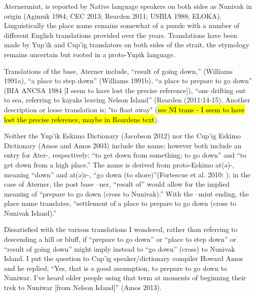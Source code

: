 Aternermiut, is reported by Native language speakers on both sides as Nunivak in origin (Agimuk 1984; CEC 2013; Rearden 2011; USBIA 1988; ELOKA). Linguistically the place name remains somewhat of a puzzle with a number of different English translations provided over the years. Translations have been made by Yup’ik and Cup’ig translators on both sides of the strait, the etymology remains uncertain but rooted in a proto-Yupik language.

Translations of the base, Aterner include, “result of going down,” (Williams 1991a), “a place to step down” (Williams 1991b), “a place to prepare to go down” (BIA ANCSA 1984 {[}I seem to have lost the precise reference{]}), “one drifting out to sea, referring to kayaks leaving Nelson Island” (Rearden (2011:14-15). Another description or loose translation is; "to float away" (\hl{see NI trans - I seem to have lost the precise reference, maybe in Reardens text}).

Neither the Yup’ik Eskimo Dictionary (Jacobson 2012) nor the Cup’ig Eskimo Dictionary (Amos and Amos 2003) include the name; however both include an entry for Ater-, respectively: “to get down from something; to go down” and “to get down from a high place.” The name is derived from proto-Eskimo at(ə)-, meaning “down” and at(ə)r-, “go down (to shore)”(Fortescue et al. 2010:   ); in the case of Aterner, the post base  –ner, “result of” would allow for the implied meaning of “prepare to go down (cross to Nunivak).” With the –miut ending, the place name translates, “settlement of a place to prepare to go down (cross to Nunivak Island).”

Dissatisfied with the various translations I wondered, rather than referring to descending a hill or bluff, if “prepare to go down” or “place to step down” or “result of going down” might imply instead to “go down” (cross) to Nunivak Island. I put the question to Cup’ig speaker/dictionary compiler Howard Amos and he replied, “Yes, that is a good assumption, to prepare to go down to Nuniwar. I've heard older people using that term at moments of beginning their trek to Nuniwar [from Nelson Island]” (Amos 2013).


